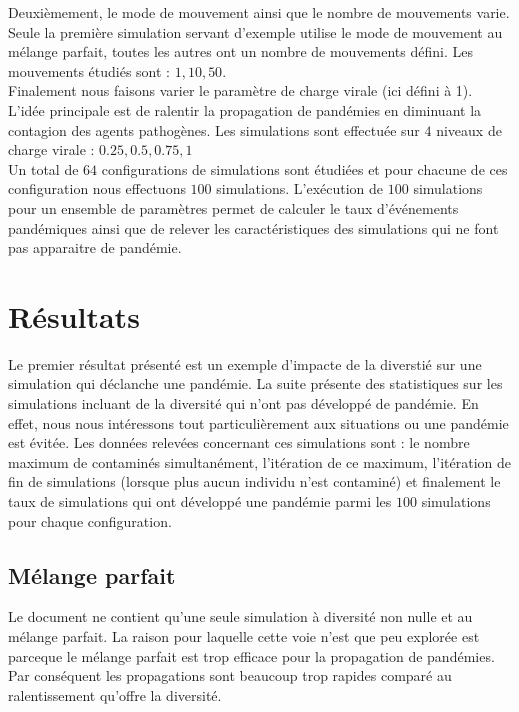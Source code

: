 Deuxièmement, le mode de mouvement ainsi que le nombre de mouvements varie. Seule la première simulation servant d'exemple utilise le mode de mouvement au mélange parfait, toutes les autres ont un nombre de mouvements défini. Les mouvements étudiés sont : $1,10,50$.\\

Finalement nous faisons varier le paramètre de charge virale (ici défini à 1). L'idée principale est de ralentir la propagation de pandémies en diminuant la contagion des agents pathogènes. Les simulations sont effectuée sur $4$ niveaux de charge virale : $0.25,0.5,0.75,1$\\

Un total de $64$ configurations de simulations sont étudiées et pour chacune de ces configuration nous effectuons $100$ simulations. L'exécution de $100$ simulations pour un ensemble de paramètres permet de calculer le taux d'événements pandémiques ainsi que de relever les caractéristiques des simulations qui ne font pas apparaitre de pandémie.

\section{Résultats}

Le premier résultat présenté est un exemple d'impacte de la diverstié sur une simulation qui déclanche une pandémie. La suite présente des statistiques sur les simulations incluant de la diversité qui n'ont pas développé de pandémie. En effet, nous nous intéressons tout particulièrement aux situations ou une pandémie est évitée. Les données relevées concernant ces simulations sont : le nombre maximum de contaminés simultanément, l'itération de ce maximum, l'itération de fin de simulations (lorsque plus aucun individu n'est contaminé) et finalement le taux de simulations qui ont développé une pandémie parmi les $100$ simulations pour chaque configuration.

\subsection{Mélange parfait}

Le document ne contient qu'une seule simulation à diversité non nulle et au mélange parfait. La raison pour laquelle cette voie n'est que peu explorée est parceque le mélange parfait est trop efficace pour la propagation de pandémies. Par conséquent les propagations sont beaucoup trop rapides comparé au ralentissement qu'offre la diversité.

